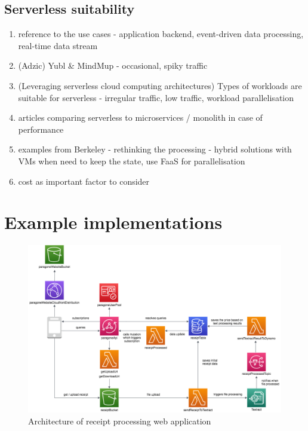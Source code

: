 \subsection{Serverless suitability}

\begin{enumerate}
    \item reference to the use cases - application backend, event-driven data processing, real-time data stream
    \item (Adzic) Yubl \& MindMup - occasional, spiky traffic
    \item (Leveraging serverless cloud computing architectures) Types of workloads are suitable for serverless - irregular traffic, low traffic, workload parallelisation
    \item articles comparing serverless to microservices / monolith in case of performance
    \item examples from Berkeley - rethinking the processing - hybrid solutions with VMs when need to keep the state, use FaaS for parallelisation
    \item cost as important factor to consider
\end{enumerate}

\section{Example implementations}

\begin{figure}[h]
    \centering
    \includegraphics[width=1\textwidth]{assets/04-serverless-for-web-apps/paragoneArchitecture.png}
    \caption{Architecture of receipt processing web application}
    \label{fig:paragone-web-app}
\end{figure}

